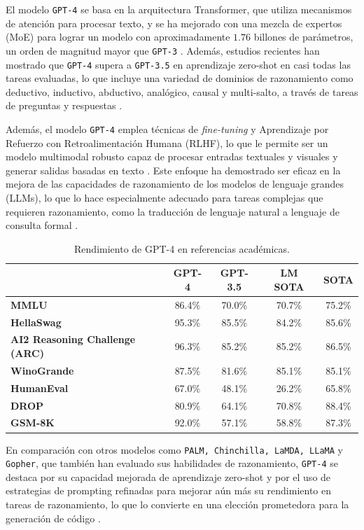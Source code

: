 El modelo  \texttt{GPT-4} se basa en la arquitectura Transformer, que utiliza mecanismos de atención para procesar texto, y se ha mejorado con una mezcla de expertos (MoE) para lograr un modelo con aproximadamente $1.76$ billones de parámetros, un orden de magnitud mayor que  \texttt{GPT-3} \cite{}. Además, estudios recientes han mostrado que  \texttt{GPT-4} supera a  \texttt{GPT-3.5} en aprendizaje zero-shot en casi todas las tareas evaluadas, lo que incluye una variedad de dominios de razonamiento como deductivo, inductivo, abductivo, analógico, causal y multi-salto, a través de tareas de preguntas y respuestas \cite{}.

Además, el modelo  \texttt{GPT-4} emplea técnicas de \textit{fine-tuning} y Aprendizaje por Refuerzo con Retroalimentación Humana (RLHF), lo que le permite ser un modelo multimodal robusto capaz de procesar entradas textuales y visuales y generar salidas basadas en texto \cite{}. Este enfoque ha demostrado ser eficaz en la mejora de las capacidades de razonamiento de los modelos de lenguaje grandes (LLMs), lo que lo hace especialmente adecuado para tareas complejas que requieren razonamiento, como la traducción de lenguaje natural a lenguaje de consulta formal \cite{}.

\begin{table}[H]
  \centering
  \caption{Rendimiento de GPT-4 en referencias académicas. \cite{}}
  \begin{tabularx}{\textwidth}{Xcccc}
    \toprule
    & \textbf{GPT-4} & \textbf{GPT-3.5} & \textbf{LM SOTA} & \textbf{SOTA} \\
    \midrule
    \textbf{MMLU} & 86.4\% & 70.0\% & 70.7\% & 75.2\% \\
    \textbf{HellaSwag} & 95.3\% & 85.5\% & 84.2\% & 85.6\% \\
    \textbf{AI2 Reasoning Challenge (ARC)} & 96.3\% & 85.2\% & 85.2\% & 86.5\% \\
    \textbf{WinoGrande} & 87.5\% & 81.6\% & 85.1\% & 85.1\% \\
    \textbf{HumanEval} & 67.0\% & 48.1\% & 26.2\% & 65.8\% \\
    \textbf{DROP} & 80.9\% & 64.1\% & 70.8\% & 88.4\% \\
    \textbf{GSM-8K} & 92.0\% & 57.1\% & 58.8\% & 87.3\% \\
    \bottomrule
  \end{tabularx}
  \label{tab:my_label}
\end{table}

En comparación con otros modelos como \texttt{PALM, Chinchilla, LaMDA, LLaMA} y \texttt{Gopher}, que también han evaluado sus habilidades de razonamiento,  \texttt{GPT-4} se destaca por su capacidad mejorada de aprendizaje zero-shot y por el uso de estrategias de prompting refinadas para mejorar aún más su rendimiento en tareas de razonamiento, lo que lo convierte en una elección prometedora para la generación de código \cite{}.

